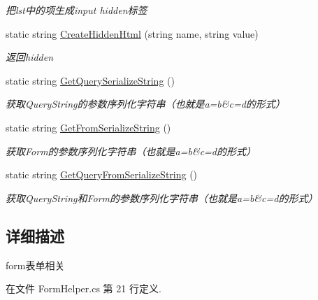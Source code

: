 \begin{DoxyCompactItemize}
\begin{DoxyCompactList}\small\item\em 把lst中的项生成input hidden标签 \end{DoxyCompactList}\item 
static string \hyperlink{class_x_c_l_net_tools_1_1_string_hander_1_1_form_helper_a3df398dd109cfe76da34602149d16410}{Create\-Hidden\-Html} (string name, string value)
\begin{DoxyCompactList}\small\item\em 返回hidden \end{DoxyCompactList}\item 
static string \hyperlink{class_x_c_l_net_tools_1_1_string_hander_1_1_form_helper_ab3d6c0e951ba151fe5efc423854bbff4}{Get\-Query\-Serialize\-String} ()
\begin{DoxyCompactList}\small\item\em 获取\-Query\-String的参数序列化字符串（也就是a=b\&c=d的形式） \end{DoxyCompactList}\item 
static string \hyperlink{class_x_c_l_net_tools_1_1_string_hander_1_1_form_helper_aa8048660a078480db6e41f2f3050c651}{Get\-From\-Serialize\-String} ()
\begin{DoxyCompactList}\small\item\em 获取\-Form的参数序列化字符串（也就是a=b\&c=d的形式） \end{DoxyCompactList}\item 
static string \hyperlink{class_x_c_l_net_tools_1_1_string_hander_1_1_form_helper_a9c3363c3f41771f044634f9e8050dc55}{Get\-Query\-From\-Serialize\-String} ()
\begin{DoxyCompactList}\small\item\em 获取\-Query\-String和\-Form的参数序列化字符串（也就是a=b\&c=d的形式） \end{DoxyCompactList}\end{DoxyCompactItemize}


\subsection{详细描述}
form表单相关 



在文件 Form\-Helper.\-cs 第 21 行定义.



